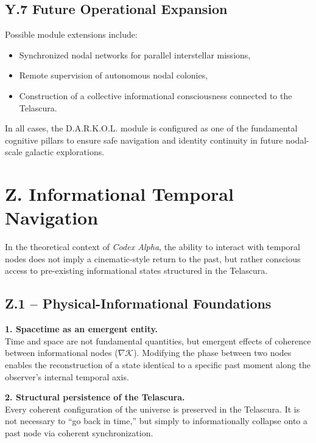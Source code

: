 \documentclass[12pt]{article}
\begin{document}
\subsection*{Y.7 Future Operational Expansion}

Possible module extensions include:

\begin{itemize}
    \item Synchronized nodal networks for parallel interstellar missions,
    \item Remote supervision of autonomous nodal colonies,
    \item Construction of a collective informational consciousness connected to the Telascura.
\end{itemize}

\noindent
In all cases, the D.A.R.K.O.L. module is configured as one of the fundamental cognitive pillars to ensure safe navigation and identity continuity in future nodal-scale galactic explorations.

\section*{Z. Informational Temporal Navigation}

In the theoretical context of \textit{Codex Alpha}, the ability to interact with temporal nodes does not imply a cinematic-style return to the past, but rather conscious access to pre-existing informational states structured in the Telascura.

\subsection*{Z.1 – Physical-Informational Foundations}

\textbf{1. Spacetime as an emergent entity.} \\
Time and space are not fundamental quantities, but emergent effects of coherence between informational nodes ($\nabla \mathcal{K}$). Modifying the phase between two nodes enables the reconstruction of a state identical to a specific past moment along the observer’s internal temporal axis.

\textbf{2. Structural persistence of the Telascura.} \\
Every coherent configuration of the universe is preserved in the Telascura. It is not necessary to “go back in time,” but simply to informationally collapse onto a past node via coherent synchronization.
\end{document}
